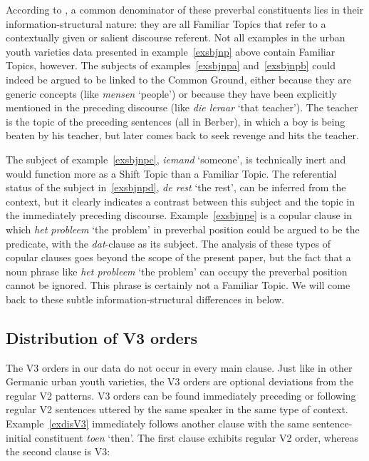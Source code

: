 \documentclass[output=paper]{langsci/langscibook}
\begin{document}
\noindent According to \textcite{Freywaldetal:2015}, a common denominator of
these preverbal constituents lies in their information-structural nature: they
are all Familiar Topics that refer to a contextually given or salient discourse
referent. Not all examples in the  urban youth varieties data presented in
example~\eqref{exsbjnp} above contain Familiar Topics, however. The subjects of
examples~\eqref{exsbjnpa} and~\eqref{exsbjnpb} could indeed be argued to be linked
to the Common Ground, either because they are generic concepts (like
\emph{mensen} `people') or because they have been explicitly mentioned in the
preceding discourse (like \emph{die leraar} `that teacher'). The teacher is the
topic of the preceding sentences (all in Berber), in which a boy is being
beaten by his teacher, but later comes back to seek revenge and hits the
teacher.

The subject of example~\eqref{exsbjnpc}, \emph{iemand} `someone', is technically
inert and would function more as a Shift Topic than a Familiar Topic. The
referential status of the subject in~\eqref{exsbjnpd}, \emph{de rest} `the rest',
can be inferred from the context, but it clearly indicates a contrast between
this subject and the topic in the immediately preceding discourse.
Example~\eqref{exsbjnpe} is a copular clause in which \emph{het
probleem} `the problem' in preverbal position could be argued to be the
predicate, with the \emph{dat}-clause as its subject. The analysis of these
types of copular clauses goes beyond the scope of the present
paper, but the fact that a noun phrase like \emph{het probleem} `the problem'
can occupy the preverbal position cannot be ignored. This phrase is certainly
not a Familiar Topic. We will come back to these subtle information-structural
differences in  below.

\subsection{Distribution of V3 orders}
\label{sec:datadis}

The V3 orders in our data do not occur in every main clause. Just like in other
Germanic urban youth varieties, the V3 orders are optional deviations from the
regular V2 patterns. V3 orders can be found immediately preceding or following
regular V2 sentences uttered by the same speaker in the same type of context.
Example~\eqref{exdisV3} immediately follows another clause with the same
sentence-initial constituent \emph{toen} `then'. The first clause exhibits
regular V2 order, whereas the second clause is V3:
\end{document}
